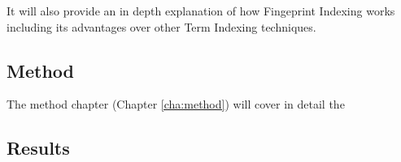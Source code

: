 It will also provide
an in depth explanation of how Fingeprint Indexing works including its advantages
over other Term Indexing techniques.

\subsection{Method}

The method chapter (Chapter \ref{cha:method}) will cover in detail the 

\subsection{Results}

